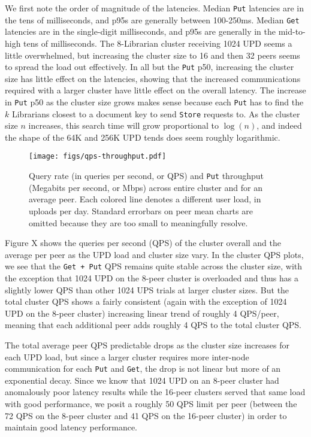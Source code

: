 \documentclass[10pt]{article}
\newcommand{\ttt}[1]{\texttt{#1}}
\def\Put{\ttt{Put}}
\begin{document}
We first note the order of magnitude of the latencies. Median \ttt{Put} latencies are in the tens of milliseconds, and p95s are generally between 100-250ms. Median \texttt{Get} latencies are in the single-digit milliseconds, and p95s are generally in the mid-to-high tens of milliseconds. The 8-Librarian cluster receiving 1024 UPD seems a little overwhelmed, but increasing the cluster size to 16 and then 32 peers seems to spread the load out effectively. In all but the \texttt{Put} p50, increasing the cluster size has little effect on the latencies, showing that the increased communications required with a larger cluster have little effect on the overall latency. The increase in \texttt{Put} p50 as the cluster size grows makes sense because each \texttt{Put} has to find the $k$ Librarians closest to a document key to send \texttt{Store} requests to. As the cluster size $n$ increases, this search time will grow proportional to $\log(n)$, and indeed the shape of the 64K and 256K UPD tends does seem roughly logarithmic. 

\begin{figure}[t]
	\centering
	\texttt{[image: figs/qps-throughput.pdf]}
	\caption{Query rate (in queries per second, or QPS) and \Put{} throughput (Megabits per second, or Mbps) across entire cluster and for an average peer. Each colored line denotes a different user load, in uploads per day. Standard errorbars on peer mean charts are omitted because they are too small to meaningfully resolve.}
\end{figure}

Figure X shows the queries per second (QPS) of the cluster overall and the average per peer as the UPD load and cluster size vary. In the cluster QPS plots, we see that the \ttt{Get + Put} QPS remains quite stable across the cluster size, with the exception that 1024 UPD on the 8-peer cluster is overloaded and thus has a slightly lower QPS than other 1024 UPS trials at larger cluster sizes. But the total cluster QPS shows a fairly consistent (again with the exception of 1024 UPD on the 8-peer cluster) increasing linear trend of roughly 4 QPS/peer, meaning that each additional peer adds roughly 4 QPS to the total cluster QPS.

The total average peer QPS predictable drops as the cluster size increases for each UPD load, but since a larger cluster requires more inter-node communication for each \ttt{Put} and \texttt{Get}, the drop is not linear but more of an exponential decay. Since we know that 1024 UPD on an 8-peer cluster had anomalously poor latency results while the 16-peer clusters served that same load with good performance, we posit a roughly 50 QPS limit per peer (between the 72 QPS on the 8-peer cluster and 41 QPS on the 16-peer cluster) in order to maintain good latency performance.
\end{document}
